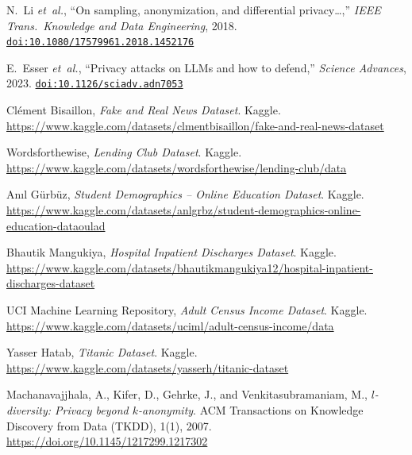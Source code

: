 \documentclass{article}
\begin{document}
\begin{thebibliography}{9}

N.~Li \emph{et~al.},
“On sampling, anonymization, and differential privacy…,”
\emph{IEEE Trans.\ Knowledge and Data Engineering}, 2018.
\href{https://www.tandfonline.com/doi/full/10.1080/17579961.2018.1452176#abstract}{%
\texttt{doi:10.1080/17579961.2018.1452176}
}

E.~Esser \emph{et~al.},
“Privacy attacks on LLMs and how to defend,”
\emph{Science Advances}, 2023.
\href{https://www.science.org/doi/full/10.1126/sciadv.adn7053}{%
\texttt{doi:10.1126/sciadv.adn7053}
}

Clément Bisaillon,
\emph{Fake and Real News Dataset}. Kaggle.
\href{https://www.kaggle.com/datasets/clmentbisaillon/fake-and-real-news-dataset}{https://www.kaggle.com/datasets/clmentbisaillon/fake-and-real-news-dataset}

Wordsforthewise,
\emph{Lending Club Dataset}. Kaggle.
\href{https://www.kaggle.com/datasets/wordsforthewise/lending-club/data}{https://www.kaggle.com/datasets/wordsforthewise/lending-club/data}

Anıl Gürbüz,
\emph{Student Demographics – Online Education Dataset}. Kaggle.
\href{https://www.kaggle.com/datasets/anlgrbz/student-demographics-online-education-dataoulad}{https://www.kaggle.com/datasets/anlgrbz/student-demographics-online-education-dataoulad}

Bhautik Mangukiya,
\emph{Hospital Inpatient Discharges Dataset}. Kaggle.
\href{https://www.kaggle.com/datasets/bhautikmangukiya12/hospital-inpatient-discharges-dataset}{https://www.kaggle.com/datasets/bhautikmangukiya12/hospital-inpatient-discharges-dataset}

UCI Machine Learning Repository,
\emph{Adult Census Income Dataset}. Kaggle.
\href{https://www.kaggle.com/datasets/uciml/adult-census-income/data}{https://www.kaggle.com/datasets/uciml/adult-census-income/data}

Yasser Hatab,
\emph{Titanic Dataset}. Kaggle.
\href{https://www.kaggle.com/datasets/yasserh/titanic-dataset}{https://www.kaggle.com/datasets/yasserh/titanic-dataset}

Machanavajjhala, A., Kifer, D., Gehrke, J., and Venkitasubramaniam, M.,
\emph{$l$-diversity: Privacy beyond $k$-anonymity}. ACM Transactions on Knowledge Discovery from Data (TKDD), 1(1), 2007.
\href{https://doi.org/10.1145/1217299.1217302}{https://doi.org/10.1145/1217299.1217302}


\end{thebibliography}
\end{document}
